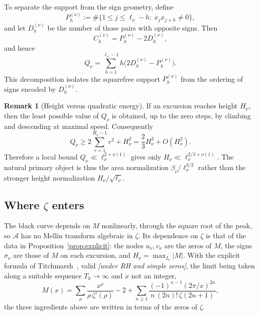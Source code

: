 \documentclass[11pt,reqno]{amsart}
\theoremstyle{plain}
\theoremstyle{definition}
\newtheorem{remark}[theorem]{Remark}
\newcommand{\Anet}{\mathcal{A}}
\begin{document}
To separate the support from the sign geometry, define
\[
  P_h^{(\nu)}:=\#\{1\le j\le \ell_\nu-h:\ x_jx_{j+h}\ne0\},
\]
and let $D_h^{(\nu)}$ be the number of those pairs with opposite signs.
Then
\begin{equation}
\label{eq:C-P-D}
  C_h^{(\nu)}=P_h^{(\nu)}-2D_h^{(\nu)},
\end{equation}
and hence
\begin{equation}
\label{eq:Q-P-D}
  Q_\nu=\sum_{h=1}^{\ell_\nu-1}
  h\bigl(2D_h^{(\nu)}-P_h^{(\nu)}\bigr).
\end{equation}
This decomposition isolates the squarefree support $P_h^{(\nu)}$ from the
ordering of signs encoded by $D_h^{(\nu)}$.

\begin{remark}[Height versus quadratic energy]
\label{rem:height-Q}
If an excursion reaches height $H_\nu$, then the least possible value of
$Q_\nu$ is obtained, up to the zero steps, by climbing and descending at
maximal speed.  Consequently
\[
  Q_\nu\ge 2\sum_{r=1}^{H_\nu-1}r^2+H_\nu^2
  =\frac{2}{3}H_\nu^3+O(H_\nu^2).
\]
Therefore a local bound $Q_\nu\ll \ell_\nu^{2+o(1)}$ gives only
$H_\nu\ll \ell_\nu^{2/3+o(1)}$.  The natural primary object is thus the
area normalization $\beta_\nu/\ell_\nu^{3/2}$ rather than the stronger
height normalization $H_\nu/\sqrt{\ell_\nu}$.
\end{remark}

\subsection{Where $\zeta$ enters}
\label{subsec:zeta}

The black curve depends on $M$ nonlinearly, through the square root of the
peak, so $\Anet$ has no Mellin transform algebraic in $\zeta$. Its
dependence on $\zeta$ is that of the data in
Proposition~\ref{prop:explicit}: the nodes $u_\nu,v_\nu$ are the zeros of
$M$, the signs $\sigma_\nu$ are those of $M$ on each excursion, and
$H_\nu=\max_{I_\nu}|M|$. With the explicit formula of
Titchmarsh~\cite[\S14.27]{Titchmarsh}, valid \emph{[under RH and simple
zeros]}, the limit being taken along a suitable sequence $T_k\to\infty$ and
$x$ not an integer,
\begin{equation}
\label{eq:explicitM}
  M(x)=\sum_{\rho}\frac{x^{\rho}}{\rho\,\zeta'(\rho)}-2
   +\sum_{n\ge1}\frac{(-1)^{n-1}(2\pi/x)^{2n}}{n\,(2n)!\,\zeta(2n+1)} ,
\end{equation}
the three ingredients above are written in terms of the zeros of $\zeta$.
\end{document}
